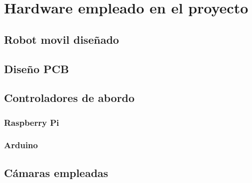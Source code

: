 \section{Hardware empleado en el proyecto}

\subsection{Robot movil diseñado}
\subsection{Diseño PCB}
\subsection{Controladores de abordo}
\subsubsection{Raspberry Pi}
\subsubsection{Arduino}
\subsection{Cámaras empleadas}